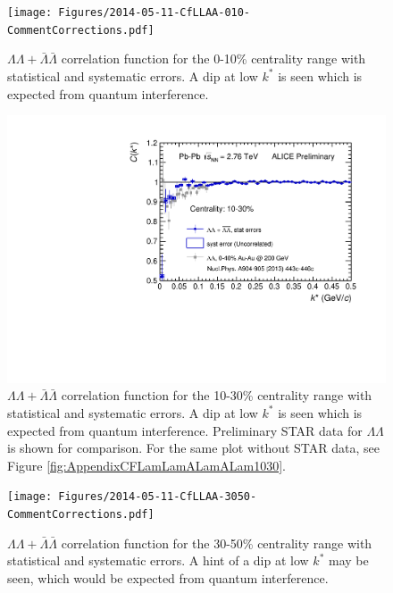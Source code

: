\begin{figure}[hbtp]
\texttt{[image: Figures/2014-05-11-CfLLAA-010-CommentCorrections.pdf]}
\caption[$\Lambda\Lambda + \bar{\Lambda}\bar{\Lambda}$ correlation function for the 0-10\% centrality range]{$\Lambda\Lambda + \bar{\Lambda}\bar{\Lambda}$ correlation function for the 0-10\% centrality range with statistical and systematic errors.  A dip at low $k^*$ is seen which is expected from quantum interference.}
\label{fig:CFLamLamALamALam010}
\end{figure}
\begin{figure}[hbtp]
\includegraphics[width=36pc]{Figures/2014-05-11-CfLLAA-1030-CommentCorrections-WithSTAR.pdf}
\caption[$\Lambda\Lambda + \bar{\Lambda}\bar{\Lambda}$ correlation function for the 10-30\% centrality range]{$\Lambda\Lambda + \bar{\Lambda}\bar{\Lambda}$ correlation function for the 10-30\% centrality range with statistical and systematic errors.  A dip at low $k^*$ is seen which is expected from quantum interference.  Preliminary STAR data for $\Lambda\Lambda$ is shown for comparison.  For the same plot without STAR data, see Figure \ref{fig:AppendixCFLamLamALamALam1030}.}
\label{fig:CFLamLamALamALam1030STAR}
\end{figure}
\begin{figure}[hbtp]
\texttt{[image: Figures/2014-05-11-CfLLAA-3050-CommentCorrections.pdf]}
\caption[$\Lambda\Lambda + \bar{\Lambda}\bar{\Lambda}$ correlation function for the 30-50\% centrality range]{$\Lambda\Lambda + \bar{\Lambda}\bar{\Lambda}$ correlation function for the 30-50\% centrality range with statistical and systematic errors.  A hint of a dip at low $k^*$ may be seen, which would be expected from quantum interference.}
\label{fig:CFLamLamALamALam3050}
\end{figure}


